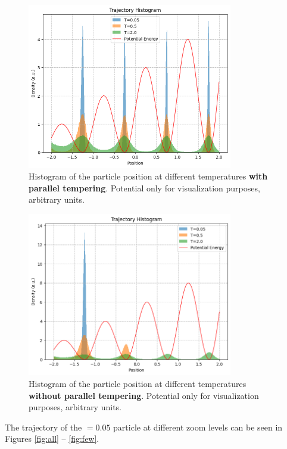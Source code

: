 \documentclass[11pt]{article}
\begin{document}
\begin{figure}[p]
	\centering
	\includegraphics[width = 0.8\textwidth]{histogram_yes.png}
	\caption{Histogram of the particle position at different temperatures \textbf{with parallel tempering}. Potential only for visualization purposes, arbitrary units.}
	\label{fig:with}
\end{figure}
\begin{figure}[p]
	\centering
	\includegraphics[width = 0.8\textwidth]{histogram_no.png}
	\caption{Histogram of the particle position at different temperatures \textbf{without parallel tempering}. Potential only for visualization purposes, arbitrary units.}
	\label{fig:without}
\end{figure}


The trajectory of the $ = 0.05$ particle at different zoom levels can be seen in Figures \ref{fig:all} -- \ref{fig:few}.
\end{document}
